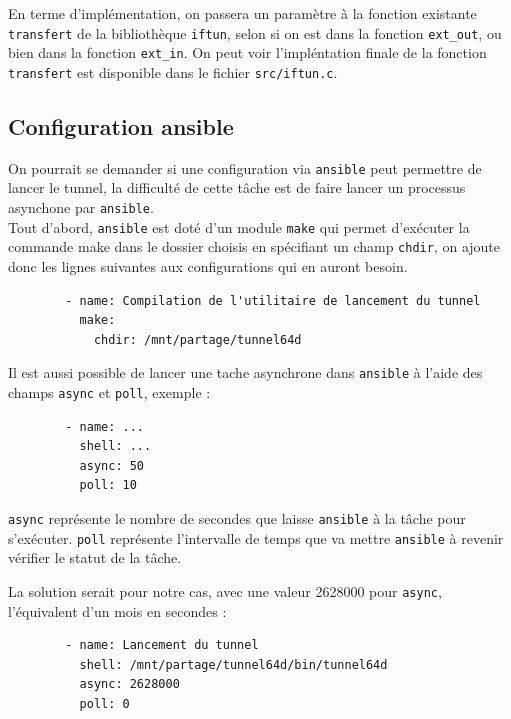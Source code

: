 \documentclass[a4paper, 10pt]{article}
\begin{document}
      En terme d'implémentation, on passera un paramètre à la fonction existante
      \verb+transfert+ de la bibliothèque \verb+iftun+, selon si on est dans la
      fonction \verb+ext_out+, ou bien dans la fonction \verb+ext_in+. On peut
      voir l'impléntation finale de la fonction \verb+transfert+ est disponible
      dans le fichier \verb+src/iftun.c+.

    \subsection{Configuration ansible}
      On pourrait se demander si une configuration via \verb+ansible+ peut
      permettre de lancer le tunnel, la difficulté de cette tâche est de faire
      lancer un processus asynchone par \verb+ansible+. \\

      Tout d'abord, \verb+ansible+ est doté d'un module \verb+make+ qui permet
      d'exécuter la commande make dans le dossier choisis en spécifiant un champ
      \verb+chdir+, on ajoute donc les lignes suivantes aux configurations qui
      en auront besoin.

      \begin{verbatim}
        - name: Compilation de l'utilitaire de lancement du tunnel
          make:
            chdir: /mnt/partage/tunnel64d
      \end{verbatim}

      Il est aussi possible de lancer une tache asynchrone dans \verb+ansible+ à
      l'aide des champs \verb+async+ et \verb+poll+, exemple :

      \begin{verbatim}
        - name: ...
          shell: ...
          async: 50
          poll: 10
      \end{verbatim}

      \verb+async+ représente le nombre de secondes que laisse \verb+ansible+ à
      la tâche pour s'exécuter. \verb+poll+ représente l'intervalle de temps que
      va mettre \verb+ansible+ à revenir vérifier le statut de la tâche.

      La solution serait pour notre cas, avec une valeur 2628000 pour
      \verb+async+, l'équivalent d'un mois en secondes :

      \begin{verbatim}
        - name: Lancement du tunnel
          shell: /mnt/partage/tunnel64d/bin/tunnel64d
          async: 2628000
          poll: 0
      \end{verbatim}
\end{document}
